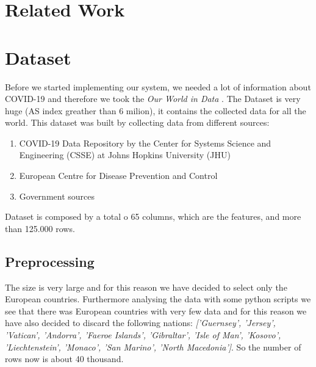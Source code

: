 \documentclass[10pt,conference]{IEEEtran}
\begin{document}
\smallbreak

\section{Related Work}

\section{Dataset}
Before we started implementing our system, we needed a lot of information about COVID-19 and therefore we took the  
{\it Our World in Data} \cite{dataset}. The Dataset is very huge (AS index greather than 6 milion), it contains the collected data for all the world. 
This dataset was built by collecting data from different sources:
\begin{enumerate}
	\item COVID-19 Data Repository by the Center for Systems Science and Engineering (CSSE) at Johns Hopkins University (JHU)
	\item European Centre for Disease Prevention and Control
	\item Government sources
\end{enumerate}
\bigskip
Dataset is composed by a total o 65 columns, which are the features, and more than 125.000 rows. 

\subsection{Preprocessing}
The size is very large and for this reason we have decided to select only the European countries. Furthermore analysing the data with some python scripts we see that there was European countries with very few data and for this reason we have also decided to discard the following nations:
{\em ['Guernsey', 'Jersey', 'Vatican', 'Andorra', 'Faeroe Islands', 'Gibraltar', 'Isle of Man', 'Kosovo', 'Liechtenstein', 'Monaco', 'San Marino', 'North Macedonia']}. 
So the number of rows now is about 40 thousand. 
\end{document}

